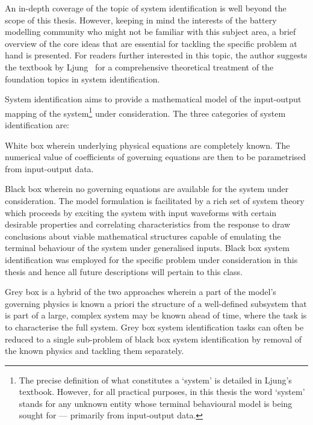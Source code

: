 

An in-depth  coverage of the topic  of system identification is  well beyond the
scope of  this thesis.  However, keeping  in mind the  interests of  the battery
modelling community  who might not be  familiar with this subject  area, a brief
overview of the core ideas that  are essential for tackling the specific problem
at hand is  presented. For readers further interested in  this topic, the author
suggests the textbook by  Ljung~\cite{Ljung1999} for a comprehensive theoretical
treatment of the foundation topics in system identification.

System identification aims  to provide a mathematical model  of the input-output
mapping  of the  system\footnote{The precise  definition of  what constitutes  a
`system' is detailed  in Ljung's textbook. However, for  all practical purposes,
in this  thesis the word `system'  stands for any unknown  entity whose terminal
behavioural model  is being  sought for ---  primarily from  input-output data.}
under consideration. The three categories of system identification are:


\begin{enumdescriptnum}[leftmargin=!,itemsep=1ex,labelwidth=\widthof{$\symbf{\text{brugg}_j}\ \scriptstyle (\times 3)$abc}
    ,partopsep=0pt
    ,topsep=0pt
    ]

\item[White  box] wherein  underlying physical  equations are  completely known.
The  numerical value  of  coefficients of  governing equations  are  then to  be
parametrised from input-output data.

\item[Black box]  wherein no  governing equations are  available for  the system
under  consideration. The  model formulation  is facilitated  by a  rich set  of
system theory  which proceeds by exciting  the system with input  waveforms with
certain desirable  properties and correlating characteristics  from the response
to draw  conclusions about viable  mathematical structures capable  of emulating
the terminal behaviour of the system  under generalised inputs. Black box system
identification was employed for the specific problem under consideration in this
thesis and hence all future descriptions will pertain to this class.

\item[Grey box] is a hybrid of the  two approaches wherein a part of the model's
governing  physics is  known  a priori  \eg{} the  structure  of a  well-defined
subsystem  that is  part  of a  large,  complex  system may  be  known ahead  of
time,  where the  task  is  to characterise  the  full  system. Grey box  system
identification tasks can  often be reduced to a single  sub-problem of black box
system  identification  by  removal  of  the known  physics  and  tackling  them
separately.

\end{enumdescriptnum}

